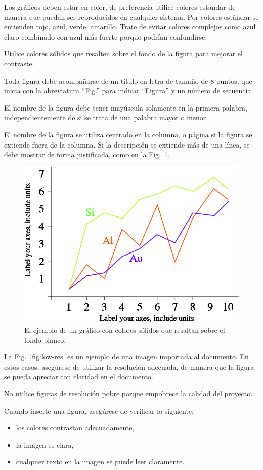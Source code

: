 ﻿\documentclass[10pt,twocolumn]{article}
\begin{document}
Los gráficos deben estar en color, de preferencia utilice colores estándar de manera que puedan ser reproducidos en cualquier sistema. Por colores estándar se entienden rojo, azul, verde, amarillo. Trate de evitar colores complejos como azul claro combinado con azul más fuerte porque podrían confundirse.

Utilice colores sólidos que resalten sobre el fondo de la figura para mejorar el contraste.

Toda figura debe acompañarse de un título en letra de tamaño de 8 puntos, que inicia con la abreviatura “Fig.” para indicar “Figura” y un número de secuencia.

El nombre de la figura debe tener mayúscula solamente en la primera palabra, independientemente de si se trata de una palabra mayor o menor.

El nombre de la figura se utiliza centrado en la columna, o página si la figura se extiende fuera de la columna. Si la descripción se extiende más de una línea, se debe mostrar de forma justificada, como en la Fig.~\ref{fig:solid-colors}.

\begin{figure}[t]
  \centering
  \includegraphics[width=0.75\columnwidth]{img/image3.png}
  \caption{El ejemplo de un gráfico con colores sólidos que resaltan sobre el fondo blanco.}
  \label{fig:solid-colors}
\end{figure}

La Fig.~\ref{fig:low-res} es un ejemplo de una imagen importada al documento. En estos casos, asegúrese de utilizar la resolución adecuada, de manera que la figura se pueda apreciar con claridad en el documento.

No utilice figuras de resolución pobre porque empobrece la calidad del proyecto.

Cuando inserte una figura, asegúrese de verificar lo siguiente:
\begin{itemize}[leftmargin=*]
  \item los colores contrastan adecuadamente,
  \item la imagen es clara,
  \item cualquier texto en la imagen se puede leer claramente.
\end{itemize}
\end{document}
